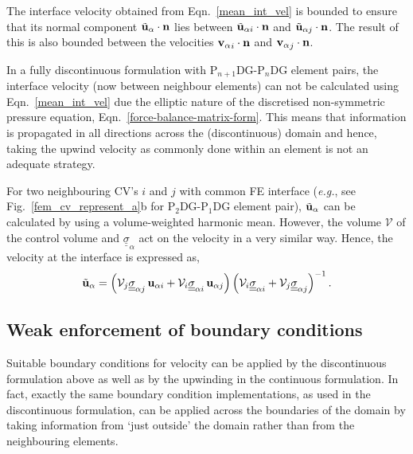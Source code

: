 \documentclass[times]{fldauth}
\newcommand{\PNDG}[2][error]{P$_{#1}$DG-P$_{#2}$DG}
\begin{document}
The interface velocity obtained from Eqn.~\ref{mean_int_vel} is bounded to ensure that its normal component ${\tilde{\bf u}_\alpha}\cdot {\bf n}$ lies between ${\tilde{\bf u}_{\alpha i}}\cdot {\bf n}$ and ${\tilde{\bf u}_{\alpha j}}\cdot {\bf n}$. The result of this is also bounded between the velocities ${{\bf v}_\alpha}_i\cdot {\bf n}$ and ${{\bf v}_\alpha}_j\cdot {\bf n}$.

\medskip

In a fully discontinuous formulation with \PNDG[n+1]{n} element pairs, the interface velocity (now between neighbour elements) can not be calculated using Eqn.~\ref{mean_int_vel} due the elliptic nature of the discretised non-symmetric pressure equation, Eqn.~\ref{force-balance-matrix-form}. This means that information is propagated in all directions across the (discontinuous) domain and hence, taking the upwind velocity as commonly done within an element is not an adequate strategy.
 
For two neighbouring CV's $i$ and $j$ with common FE interface ({\it e.g.}, see Fig.~\ref{fem_cv_represent_a}b for \PNDG[2]{1} element pair), $\tilde{\bf u}_\alpha$ can be calculated by using a volume-weighted harmonic mean. However, the volume $\mathcal{V}$ of the control volume and $\underline{\underline{\sigma}}_{\alpha}$ act on the velocity in a very similar way. Hence, the velocity at the interface is expressed as,
\begin{equation} 
  {\tilde{\bf u}_\alpha} =  \left(\mathcal{V}_{j}  
    \underline{\underline{\sigma}}_{\alpha j} \, {\bf
      u}_{\alpha i} + \mathcal{V}_{i} \underline{\underline{\sigma}}_{\alpha i}\, {\bf
      u}_{\alpha j} \right) \left(  \mathcal{V}_{i} 
    \underline{\underline{\sigma}}_{\alpha i} +
    \mathcal{V}_{j} 
    \underline{\underline{\sigma}}_{\alpha j} \right)^{-1}.
\end{equation} 


\subsection{Weak enforcement of boundary conditions}\label{bcs-rel-perm} 
Suitable boundary conditions for velocity can be applied by the
discontinuous formulation above as well as by the upwinding in the
continuous formulation. In fact, exactly the same boundary condition
implementations, as used in the discontinuous formulation, can be
applied across the boundaries of the domain by taking information from
`just outside' the domain rather than from the neighbouring elements.
\end{document}
